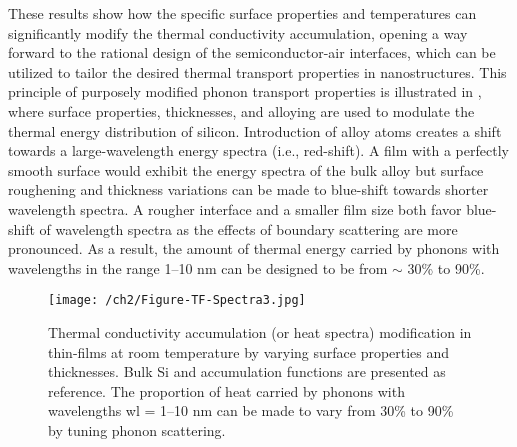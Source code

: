 \par These results show how the specific surface properties and temperatures can significantly modify the thermal conductivity accumulation, opening a way forward to the rational design of the semiconductor-air interfaces, which can be utilized to tailor the desired thermal transport properties in nanostructures. This principle of purposely modified phonon transport properties is illustrated in , where surface properties, thicknesses, and alloying are used to modulate the thermal energy distribution of silicon. Introduction of alloy atoms creates a shift towards a large-wavelength energy spectra (i.e., red-shift). A film with a perfectly smooth surface would exhibit the energy spectra of the bulk alloy but surface roughening and thickness variations can be made to blue-shift towards shorter wavelength spectra. A rougher interface and a smaller film size both favor blue-shift of wavelength spectra as the effects of boundary scattering are more pronounced. As a result, the amount of thermal energy carried by phonons with wavelengths in the range 1–10 nm can be designed to be from $\sim$ 30\% to 90\%.
\begin{figure}[hbt]
  \centering \texttt{[image: /ch2/Figure-TF-Spectra3.jpg]}
  \caption{Thermal conductivity accumulation (or heat spectra) modification in  thin-films at room temperature by varying surface properties and thicknesses. Bulk Si and  accumulation functions are presented as reference. The proportion of heat carried by phonons with wavelengths \gls{wl} = 1–10 nm can be made to vary from 30\% to 90\% by tuning phonon scattering.}
  \label{fig:ch2-tf-spectra-3}
\end{figure}


